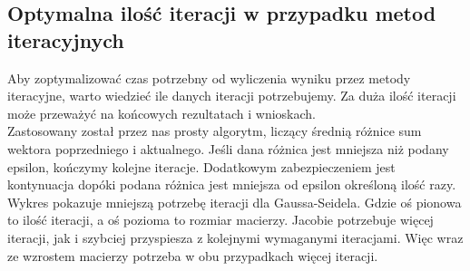 \documentclass[8pt]{article}
\begin{document}
\begin{center}
\end{center}


\subsection*{Optymalna ilość iteracji w przypadku metod iteracyjnych}
Aby zoptymalizować czas potrzebny od wyliczenia wyniku przez metody iteracyjne, warto wiedzieć ile danych iteracji potrzebujemy. Za duża ilość iteracji może przeważyć na końcowych rezultatach i wnioskach.\\
Zastosowany został przez nas prosty algorytm, liczący średnią różnice sum wektora poprzedniego i aktualnego. Jeśli dana różnica jest mniejsza niż podany epsilon, kończymy kolejne iteracje. Dodatkowym zabezpieczeniem jest kontynuacja dopóki podana różnica jest mniejsza od epsilon określoną ilość razy.\\
Wykres pokazuje mniejszą potrzebę iteracji dla Gaussa-Seidela. Gdzie oś pionowa to ilość iteracji, a oś pozioma to rozmiar macierzy. Jacobie potrzebuje więcej iteracji, jak i szybciej przyspiesza z kolejnymi wymaganymi iteracjami. Więc wraz ze wzrostem macierzy potrzeba w obu przypadkach więcej iteracji.
\begin{center}
\end{center}
\end{document}
